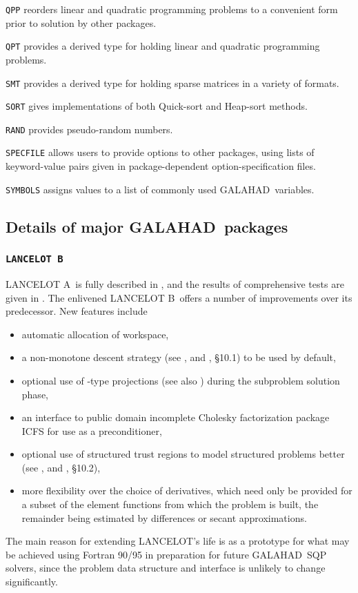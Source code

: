 \documentclass[twoside]{article}
\newcommand{\gal}{{\sf GALAHAD}}
\newcommand{\lan}{{\sf LANCELOT}}
\newcommand{\lana}{{\sf LANCELOT A}}
\newcommand{\lanb}{{\sf LANCELOT B}}
\renewcommand{\itt}[1]{\item{{\tt #1}}}
\begin{document}
\begin{description}

\itt{QPP} reorders linear and quadratic programming 
problems to a convenient form prior to solution by other packages.

\itt{QPT} provides a derived type for holding linear and quadratic programming 
problems.

\itt{SMT} provides a derived type for holding sparse matrices in a variety of
formats.

\itt{SORT} gives implementations of both Quick-sort and Heap-sort methods.

\itt{RAND} provides pseudo-random numbers.

\itt{SPECFILE} allows users to provide options to other packages, using lists
of keyword-value pairs given in package-dependent option-specification files.

\itt{SYMBOLS} assigns values to a list of commonly used \gal\ variables.

\end{description}

\subsection{Details of major \gal\ packages\label{major}}

\subsubsection{{\tt LANCELOT B}\label{lanb}}

\lana\ is fully described in , and the results
of comprehensive tests are given in .
The enlivened \lanb\ offers a number of improvements over its predecessor.
New features include
\begin{itemize}
\item automatic allocation of workspace,
\item a non-monotone descent strategy (see , and 
, \S10.1) to be used by default,
\item optional use of -type projections 
   (see also ) 
   during the subproblem solution phase,
\item an interface to  public domain incomplete Cholesky 
   factorization package ICFS for use as a preconditioner,
\item optional use of structured trust regions to model 
   structured problems better (see , and
   , \S10.2),
\item more flexibility over the choice of derivatives, which need
   only be provided for a subset of the element functions from which the 
   problem is built, the remainder being estimated by differences or secant 
   approximations.  
\end{itemize}
The main reason for extending \lan's life is as a prototype
for what may be achieved using Fortran 90/95 in preparation for 
future \gal\ SQP solvers, since the problem data structure and
interface is unlikely to change significantly.
\end{document}
